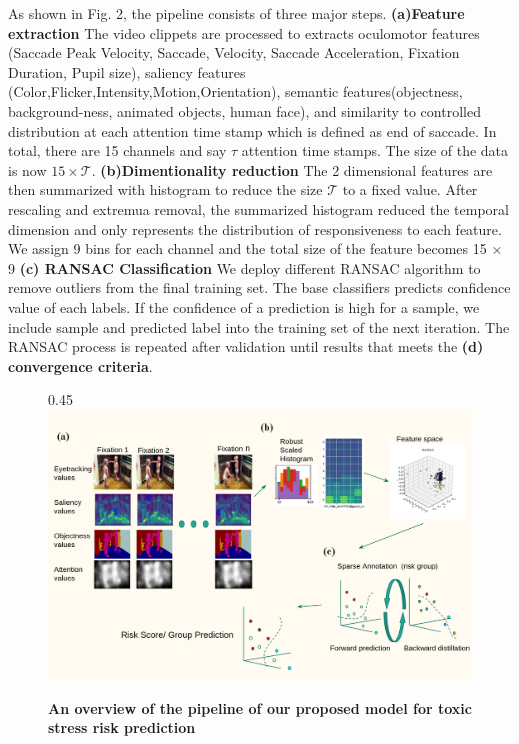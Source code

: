 \documentclass[a4paper, times, 12pt, ,onecolumn,oneside,top=1.0cm,bottom=1.0cm,left=1.0 cm,right=1cm]{article}
\begin{document}
As shown in Fig. 2, the pipeline consists of three major steps. \textbf{(a)Feature extraction} The video clippets are processed to extracts oculomotor features (Saccade Peak Velocity, Saccade, Velocity, Saccade Acceleration, Fixation Duration, Pupil size), saliency features (Color,Flicker,Intensity,Motion,Orientation), semantic features(objectness, background-ness, animated objects, human face), and similarity to controlled distribution at each attention time stamp which is defined as end of saccade. In total, there are 15 channels and say $\tau$ attention time stamps. The size of the data is now $15  \times \mathcal{T}$.   \textbf{(b)Dimentionality reduction} The 2 dimensional features are then summarized with histogram to reduce the size $\mathcal{T}$ to a fixed value. After rescaling and extremua removal, the summarized histogram reduced the temporal dimension and only represents the distribution of responsiveness to each feature. We assign 9 bins for each channel and the total size of the feature becomes 15 $\times$ 9 \textbf{(c) RANSAC Classification} We deploy different RANSAC algorithm to remove outliers from the final training set. The base classifiers predicts confidence value of each labels. If the confidence of a prediction is high for a sample, we include sample and predicted label into the training set of the next iteration. The RANSAC process is repeated after validation until results that meets the \textbf{ (d) convergence criteria}.
\begin{figure}{0.45\textwidth}  
\centering
     \includegraphics[scale = 0.25]{imgs/our_pipeline.png}
  \caption{\textbf{An overview of the pipeline of our proposed model for toxic stress risk prediction} }
\end{figure}
\clearpage
    
\end{document}
